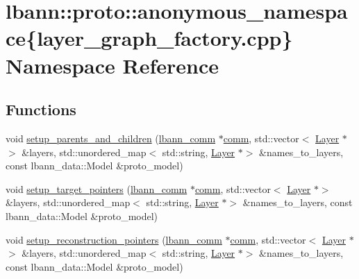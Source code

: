 \hypertarget{namespacelbann_1_1proto_1_1anonymous__namespace_02layer__graph__factory_8cpp_03}{}\section{lbann\+:\+:proto\+:\+:anonymous\+\_\+namespace\{layer\+\_\+graph\+\_\+factory.\+cpp\} Namespace Reference}
\label{namespacelbann_1_1proto_1_1anonymous__namespace_02layer__graph__factory_8cpp_03}
\subsection*{Functions}
\begin{DoxyCompactItemize}
\item 
void \hyperlink{namespacelbann_1_1proto_1_1anonymous__namespace_02layer__graph__factory_8cpp_03_abbebb0b2e6ba1befb14b0b790eac96a0}{setup\+\_\+parents\+\_\+and\+\_\+children} (\hyperlink{classlbann_1_1lbann__comm}{lbann\+\_\+comm} $\ast$\hyperlink{file__io_8cpp_ab048c6f9fcbcfaa57ce68b00263dbebe}{comm}, std\+::vector$<$ \hyperlink{classlbann_1_1Layer}{Layer} $\ast$$>$ \&layers, std\+::unordered\+\_\+map$<$ std\+::string, \hyperlink{classlbann_1_1Layer}{Layer} $\ast$$>$ \&names\+\_\+to\+\_\+layers, const lbann\+\_\+data\+::\+Model \&proto\+\_\+model)
\item 
void \hyperlink{namespacelbann_1_1proto_1_1anonymous__namespace_02layer__graph__factory_8cpp_03_a049fcca970d819d3c08bfdf71883de5c}{setup\+\_\+target\+\_\+pointers} (\hyperlink{classlbann_1_1lbann__comm}{lbann\+\_\+comm} $\ast$\hyperlink{file__io_8cpp_ab048c6f9fcbcfaa57ce68b00263dbebe}{comm}, std\+::vector$<$ \hyperlink{classlbann_1_1Layer}{Layer} $\ast$$>$ \&layers, std\+::unordered\+\_\+map$<$ std\+::string, \hyperlink{classlbann_1_1Layer}{Layer} $\ast$$>$ \&names\+\_\+to\+\_\+layers, const lbann\+\_\+data\+::\+Model \&proto\+\_\+model)
\item 
void \hyperlink{namespacelbann_1_1proto_1_1anonymous__namespace_02layer__graph__factory_8cpp_03_ac0c3ac49d16d6926308c336149a2f039}{setup\+\_\+reconstruction\+\_\+pointers} (\hyperlink{classlbann_1_1lbann__comm}{lbann\+\_\+comm} $\ast$\hyperlink{file__io_8cpp_ab048c6f9fcbcfaa57ce68b00263dbebe}{comm}, std\+::vector$<$ \hyperlink{classlbann_1_1Layer}{Layer} $\ast$$>$ \&layers, std\+::unordered\+\_\+map$<$ std\+::string, \hyperlink{classlbann_1_1Layer}{Layer} $\ast$$>$ \&names\+\_\+to\+\_\+layers, const lbann\+\_\+data\+::\+Model \&proto\+\_\+model)

\end{DoxyCompactItemize}
